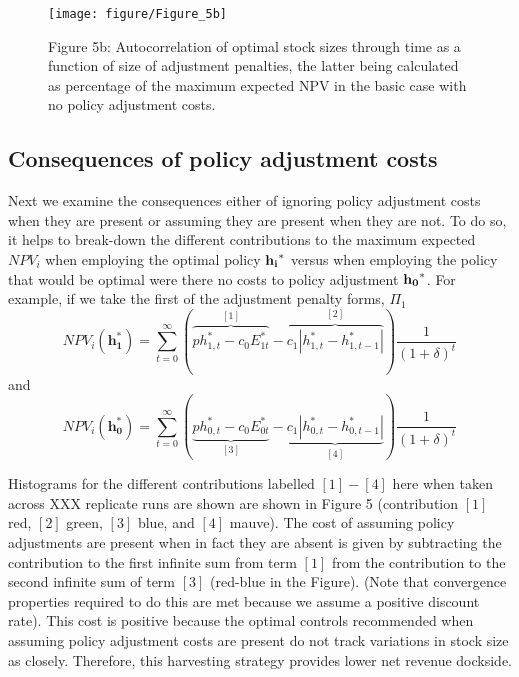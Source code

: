 \documentclass{article}\usepackage[]{graphicx}\usepackage[]{color}
\newenvironment{knitrout}{}{} %
\begin{document}
\begin{figure}
\begin{knitrout}
\color{fgcolor}
\texttt{[image: figure/Figure\_5b]} 

\end{knitrout}

\caption*{Figure 5b: Autocorrelation of optimal stock sizes through time as a function of size of adjustment penalties, the latter being calculated as percentage of the maximum expected NPV in the basic case with no policy adjustment costs. }
\end{figure}









\subsection*{Consequences of policy adjustment costs}

Next we examine the consequences either of ignoring policy adjustment costs when they are present or assuming they are present when they are not. To do so, it helps to break-down the different contributions to the maximum expected $NPV_i$ when employing the optimal policy $\bf{h_i}^*$ versus when employing the policy that would be optimal were there no costs to policy adjustment $\bf{h_0}^*$. For example, if we take the first of the adjustment penalty forms, $\Pi_1$
\begin{equation}
 NPV_i( \mathbf{h_1^*} ) = \sum_{t=0}^\infty (\overbrace{ p h^*_{1,t}-c_0E^*_{1t}}^{[1]}-\overbrace{c_1 | h^*_{1,t}- h^*_{1,t-1}|}^{[2]} ) \displaystyle \frac{1}{(1+\delta)^t}
\end{equation}
and 
\begin{equation}
 NPV_i( \mathbf{h_0^*} ) = \sum_{t=0}^\infty (\underbrace{ p h^*_{0,t}-c_0E^*_{0t}}_{[3]}-\underbrace{c_1 | h^*_{0,t}- h^*_{0,t-1}|}_{[4]} ) \displaystyle \frac{1}{(1+\delta)^t}
\end{equation}

Histograms for the different contributions labelled $[1]-[4]$ here when taken across XXX replicate runs are shown are shown in Figure 5 (contribution $[1]$ red, $[2]$ green, $[3]$ blue, and $[4]$ mauve). The cost of assuming policy adjustments are present when in fact they are absent is given by subtracting the contribution to the first infinite sum from term $[1]$ from the contribution to the second infinite sum of term $[3]$ (red-blue in the Figure). (Note that convergence properties required to do this are met because we assume a positive discount rate). This cost is positive because the optimal controls recommended when assuming policy adjustment costs are present do not track variations in stock size as closely. Therefore, this harvesting strategy provides lower net revenue dockside.
\end{document}
